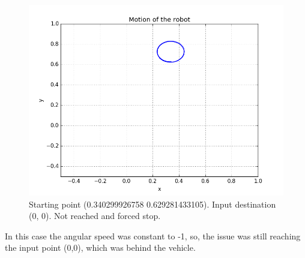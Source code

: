 \documentclass[a4paper,11pt,oneside]{book}
\begin{document}
\begin{figure}[H]
\begin{center}
\includegraphics[width=1\textwidth]{figs/experiments/6}
\caption[Experiment: Destination (0, 0)]{Starting point (0.340299926758 0.629281433105). Input destination (0, 0). Not reached and forced stop.}
\end{center}
\end{figure}

In this case the angular speed was constant to -1, so, the issue was still reaching the input point (0,0), which was behind the vehicle.


\end{document}
